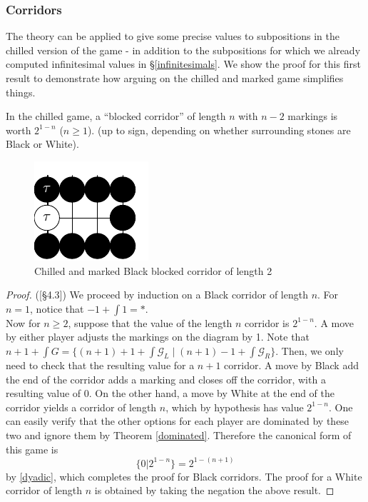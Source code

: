 \documentclass[../math194_paper.tex]{subfiles}
\begin{document}
\subsubsection{Corridors}
The theory can be applied to give some precise values to subpositions in the chilled version of the game - 
in addition to the subpositions for which we already computed infinitesimal values in \S \ref{infinitesimals}.
We show the proof for this first result to demonstrate how arguing on the chilled and marked game simplifies 
things.
\begin{theorem}
    \label{blocked_corridor}
    In the chilled game, a ``blocked corridor'' of length $n$ with $n-2$ markings is worth $2^{1-n}$ ($n\geq1$).
    (up to sign, depending on whether surrounding stones are Black or White).
\end{theorem}

\begin{figure}[H]
    \centering
    \includegraphics{figures/blocked_corridor.pdf}
    \caption*{Chilled and marked Black blocked corridor of length 2}
\end{figure}
\begin{proof}(\cite{berlekamp1991introductory}[\S 4.3]) 
We proceed by induction on a Black corridor of length $n$. For $n=1$, notice that $-1 + \int 1 = *$. \\
Now for $n \geq 2$, suppose that the value 
of the length $n$ corridor is $2^{1-n}$. A move by either player adjusts the markings on the diagram by 1. 
Note that $n+1 + \int G = \{(n + 1 )+ 1 + \int \mathcal{G}_L \mid (n+1) -1 + \int \mathcal{G}_R \}$. Then, we only 
need  to check that the resulting value for a $n+1$ corridor. A move by Black add the end 
of the corridor adds a marking and closes off the corridor, with a resulting value of $0$. On the other 
hand, a move by White at the end of the corridor yields a corridor of 
length $n$, which by hypothesis has value $2^{1-n}$. One can easily verify that the other options for each 
player are dominated by these two and ignore them by Theorem \ref{dominated}. Therefore the canonical form of 
this game is 
\[
    \{0| 2^{1-n}\} = 2^{1-(n+1)}
\]
by \ref{dyadic}, which completes the proof for Black corridors. 
The proof for a White corridor of length $n$ is obtained by taking the negation the above result.
\end{proof}
\end{document}
